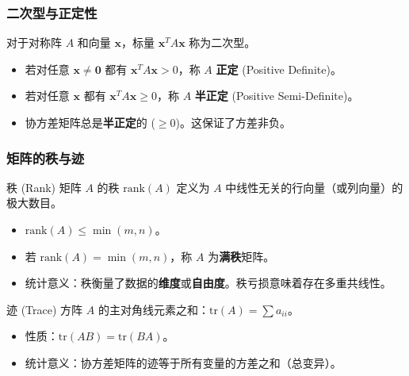 
\begin{frame}
\frametitle{二次型与正定性}

对于对称阵 $A$ 和向量 $\mathbf{x}$，标量 $\mathbf{x}^T A \mathbf{x}$ 称为二次型。
\begin{itemize}
    \item 若对任意 $\mathbf{x} \neq \mathbf{0}$ 都有 $\mathbf{x}^T A \mathbf{x} > 0$，称 $A$ \textbf{正定} (Positive Definite)。
    \item 若对任意 $\mathbf{x}$ 都有 $\mathbf{x}^T A \mathbf{x} \ge 0$，称 $A$ \textbf{半正定} (Positive Semi-Definite)。
    \item 协方差矩阵总是\textbf{半正定}的 ($\ge 0$)。这保证了方差非负。
\end{itemize}

\end{frame}


\begin{frame}
\frametitle{矩阵的秩与迹}

\begin{block}{秩 (Rank)}
矩阵 $A$ 的秩 $\mathrm{rank}(A)$ 定义为 $A$ 中线性无关的行向量（或列向量）的极大数目。
\begin{itemize}
    \item $\mathrm{rank}(A) \le \min(m, n)$。
    \item 若 $\mathrm{rank}(A) = \min(m, n)$，称 $A$ 为\textbf{满秩}矩阵。
    \item 统计意义：秩衡量了数据的\textbf{维度}或\textbf{自由度}。秩亏损意味着存在多重共线性。
\end{itemize}
\end{block}

\pause

\begin{block}{迹 (Trace)}
方阵 $A$ 的主对角线元素之和：$\mathrm{tr}(A) = \sum a_{ii}$。
\begin{itemize}
    \item 性质：$\mathrm{tr}(AB) = \mathrm{tr}(BA)$。
    \item 统计意义：协方差矩阵的迹等于所有变量的方差之和（总变异）。
\end{itemize}
\end{block}

\end{frame}


